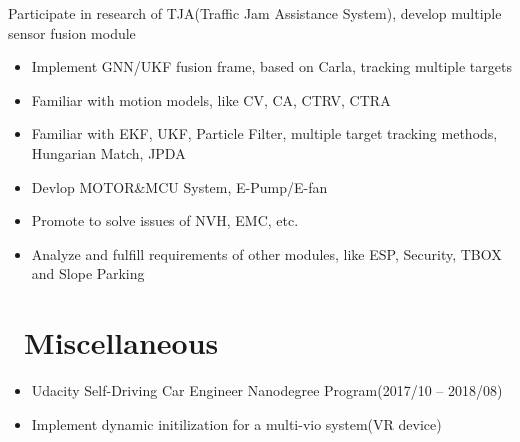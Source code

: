 \documentclass{resume}
\begin{document}
Participate in research of TJA(Traffic Jam Assistance System), develop multiple sensor fusion module
\begin{itemize}
  \item Implement GNN/UKF fusion frame, based on Carla, tracking multiple targets
  \item Familiar with motion models, like CV, CA, CTRV, CTRA
  \item Familiar with EKF, UKF, Particle Filter, multiple target tracking methods, Hungarian Match, JPDA
\end{itemize}


\begin{itemize}
  \item Devlop MOTOR\&MCU System, E-Pump/E-fan
  \item Promote to solve issues of NVH, EMC, etc.
  \item Analyze and fulfill requirements of other modules, like ESP, Security, TBOX and Slope Parking
\end{itemize}


\section{\faCode\ Miscellaneous}
\begin{itemize}[parsep=0.5ex]
  \item Udacity Self-Driving Car Engineer Nanodegree Program(2017/10 -- 2018/08)
  \item Implement dynamic initilization for a multi-vio system(VR device)
\end{itemize}

%
%
\end{document}
